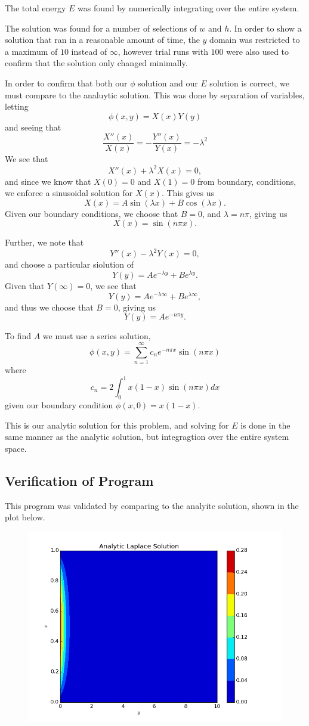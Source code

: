 \documentclass[10pt,letter]{article}
\begin{document}
The total energy $E$ was found by numerically integrating over the entire system.

The solution was found for a number of selections of $w$ and $h$. In order to show a solution that ran in a reasonable amount of time, the $y$ domain was restricted to a maximum of $10$ instead of $\infty$, however trial runs with $100$ were also used to confirm that the solution only changed minimally.

In order to confirm that both our $\phi$ solution and our $E$ solution is correct, we must compare to the analuytic solution. This was done by separation of variables, letting
$$\phi(x,y)=X(x)Y(y)$$
and seeing that
$$\frac{X''(x)}{X(x)} = -\frac{Y''(x)}{Y(x)} = -\lambda^2$$
We see that 
$$X''(x) + \lambda^2X(x)=0,$$
and since we know that $X(0)=0$ and $X(1)=0$ from boundary, conditions, we enforce a sinusoidal solution for $X(x)$. This gives us
$$X(x) = A\sin(\lambda x) + B\cos(\lambda x).$$ Given our boundary conditions, we choose that $B=0$, and $\lambda = n \pi$, giving us $$X(x) = \sin(n \pi x) .$$

Further, we note that $$Y''(x) - \lambda^2Y(x)=0,$$ and choose a particular siolution of $$Y(y) = Ae^{-\lambda y}+Be^{\lambda y}.$$ Given that $Y(\infty) = 0$, we see that $$Y(y) = Ae^{-\lambda \infty}+Be^{\lambda \infty},$$ and thus we choose that $B=0$, giving us $$Y(y) = Ae^{-n \pi y}.$$

To find $A$ we must use a series solution, $$\phi(x,y) = \sum_{n=1}^\infty c_n e^{-n \pi x} \sin(n \pi x) $$ where $$c_n = 2\int_0^1x(1-x)\sin(n \pi x) dx$$ given our boundary condition $\phi(x,0) = x(1-x)$.

This is our analytic solution for this problem, and solving for $E$ is done in the same manner as the analytic solution, but integragtion over the entire system space.


\subsection{Verification of Program}

This program was validated by comparing to the analyitc solution, shown in the plot below.

\begin{figure}[H]
  \centering
    \includegraphics[width=.6\textwidth]{homework7_problem1_plot0}
\end{figure}
\end{document}
